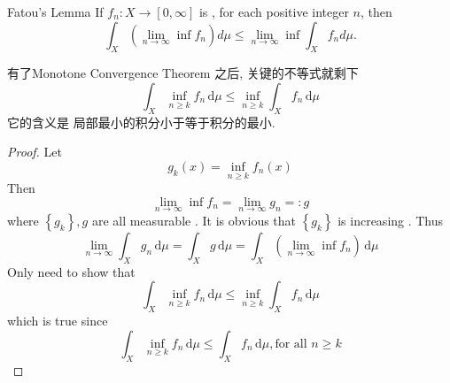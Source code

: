 \documentclass[../main.tex]{subfiles}
\begin{document}
\begin{lemma}{Fatou's Lemma}{}
If $f_n: X \to [0, \infty]$ is , for each positive integer $n$, then
\[
\int_X \left( \lim_{n \to \infty} \inf f_n \right) d\mu \le \lim_{n \to \infty} \inf \int_X f_n d\mu.
\tag{1}
\]

\end{lemma}

\begin{note}
   有了Monotone Convergence Theorem 之后, 关键的不等式就剩下 \[
    \int_{X}\inf _{n\ge k} f_{n}\,\mathrm{d} \mu \le  \inf _{n\ge k} \int_{X}f_{n}\,\mathrm{d} \mu  
    \] 它的含义是 局部最小的积分小于等于积分的最小. 
\end{note}
\begin{proof}
    Let \[
    g_{k}\left( x \right) =  \inf _{n\ge k} f_{n}\left( x \right) 
    \] Then \[
    \lim_{n\to \infty} \inf  f_{n}=  \lim_{n\to \infty}g_{n}=: g
    \]where  \(  \left\{ g_{k} \right\} , g  \)  are all measurable .   It is obvious that \(  \left\{ g_{k} \right\}  \) is increasing .  Thus \[
    \lim_{n\to \infty}  \int_{X}g_{n}\,\mathrm{d} \mu =  \int_{X}g\,\mathrm{d} \mu =  \int_{X}\left( \lim_{n\to \infty}\inf f_{n} \right)\,\mathrm{d} \mu  
    \]Only need to show that \[
    \int_{X}\inf _{n\ge k} f_{n}\,\mathrm{d} \mu \le  \inf _{n\ge k} \int_{X}f_{n}\,\mathrm{d} \mu  
    \] which is true since \[
    \int_{X}\inf _{n\ge k}f_{n}\,\mathrm{d} \mu \le  \int_{X}f_{n}\,\mathrm{d} \mu  ,\text{for all   }  n\ge k
    \]
\end{proof}
\end{document}
